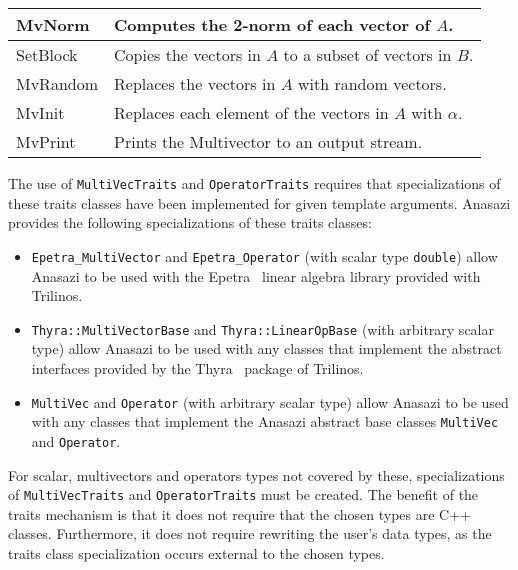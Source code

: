 \documentclass[acmtoms]{acmtrans2m}
\newcommand{\aspace}[1]{\texttt{#1}}
\begin{document}
\begin{table}
\begin{center}
\begin{tabular}{| p{3cm} | p{8cm} |}
MvNorm          & Computes the 2-norm of each vector of
$A$.  \\\hline

SetBlock        & Copies the vectors in $A$ to a subset of vectors in
$B$. \\\hline

MvRandom & Replaces the vectors in $A$ with random vectors.  \\\hline

MvInit & Replaces each element of the vectors in $A$ with $\alpha$.
\\\hline

MvPrint         & Prints the Multivector to an output stream.
\\\hline \hline
\end{tabular}
\end{center}
\end{table}

The use of \aspace{MultiVecTraits} and \aspace{OperatorTraits} requires that
specializations of these traits classes have been implemented for
given template arguments. Anasazi provides the following
specializations of these traits classes:
\begin{itemize}
  \item \aspace{Epetra\_MultiVector} and \aspace{Epetra\_Operator} (with scalar type
    \aspace{double}) allow Anasazi to be used with the Epetra~\cite{Trilinos:Epetra} linear
    algebra library provided with Trilinos.
  \item \aspace{Thyra::MultiVectorBase} and \aspace{Thyra::LinearOpBase} (with arbitrary scalar type)
        allow Anasazi to be used with any classes that implement the abstract interfaces
        provided by the Thyra~\cite{Trilinos:Thyra} package of Trilinos.
  \item \aspace{MultiVec} and \aspace{Operator} (with arbitrary scalar type)
        allow Anasazi to be used with any classes that implement
        the Anasazi abstract base classes \aspace{MultiVec} and \aspace{Operator}.
\end{itemize}

For scalar, multivectors and operators types not covered by these, specializations of
\aspace{MultiVecTraits} and \aspace{OperatorTraits} must be created. The benefit of the
traits mechanism is that it does not require that the chosen types are C++ classes.
Furthermore, it does not require rewriting the user's data types, as the traits class
specialization occurs external to the chosen types.
\end{document}
